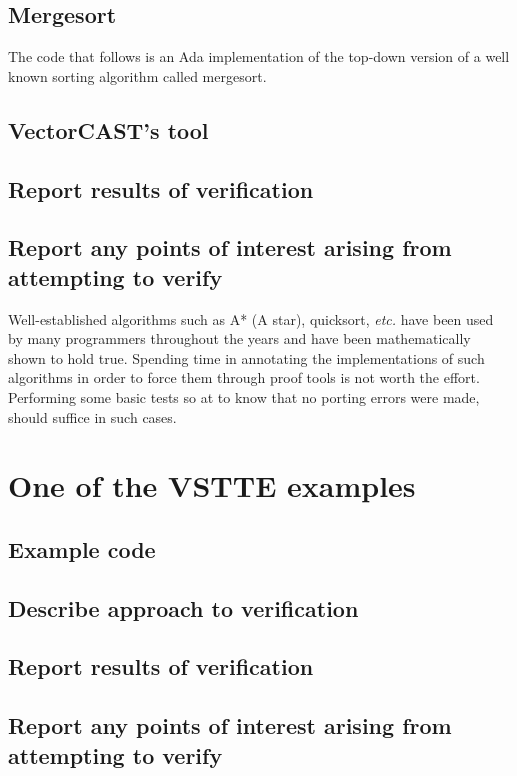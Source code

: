 \documentclass{llncs}
\newcommand{\etc}{\textit{etc.}\xspace}
\begin{document}
\subsection{Mergesort}
The code that follows is an Ada implementation of the top-down version of a well
known sorting algorithm called mergesort.



\subsection{VectorCAST's tool}

\subsection{Report results of verification}

\subsection{Report any points of interest arising from attempting to verify}
Well-established algorithms such as A* (A star), quicksort, \etc have
been used by many programmers throughout the years and have been mathematically
shown to hold true. Spending time in annotating the implementations of such algorithms
in order to force them through proof tools is not worth the effort. Performing some
basic tests so at to know that no porting errors were made, should suffice in such
cases.



\section{One of the VSTTE examples}
\subsection{Example code}
\subsection{Describe approach to verification}
\subsection{Report results of verification}
\subsection{Report any points of interest arising from attempting to verify}
\end{document}
